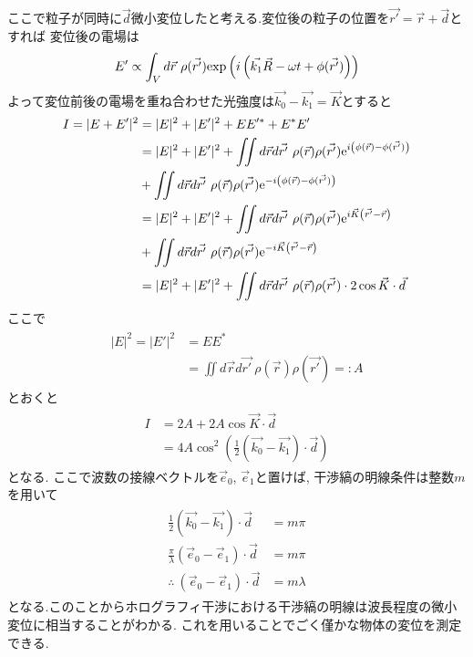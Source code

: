 ここで粒子が同時に$\vec{d}$微小変位したと考える.変位後の粒子の位置を$\vec{r'}=\vec{r}+\vec{d}$とすれば
変位後の電場は
\begin{align}
  E'\propto\int_Vd\vec{r}\ \rho(\vec{r'}){\rm exp}\left(i\left(\vec{k_1}\vec{R}-\omega t+\phi(\vec{r'})\right)\right)
\end{align}
よって変位前後の電場を重ね合わせた光強度は$\vec{k_0}-\vec{k_1}=\vec{K}$とすると
\begin{align}
  \begin{split}
    I=|E+E'|^2&=|E|^2+|E'|^2+EE'^*+E^*E'\\
    &=|E|^2+|E'|^2+\iint d\vec{r}d\vec{r'}\ \rho(\vec{r})\rho(\vec{r'}){\rm e}^{i\left(\phi(\vec{r})-\phi(\vec{r'})\right)}\\
    &+\iint d\vec{r}d\vec{r'}\ \rho(\vec{r})\rho(\vec{r'}){\rm e}^{-i\left(\phi(\vec{r})-\phi(\vec{r'})\right)}\\
    &=|E|^2+|E'|^2+\iint d\vec{r}d\vec{r'}\ \rho(\vec{r})\rho(\vec{r'}){\rm e}^{i\vec{K}\left(\vec{r'}-\vec{r}\right)}\\
    &+\iint d\vec{r}d\vec{r'}\ \rho(\vec{r})\rho(\vec{r'}){\rm e}^{-i\vec{K}\left(\vec{r'}-\vec{r}\right)}\\
    &=|E|^2+|E'|^2+\iint d\vec{r}d\vec{r'}\ \rho(\vec{r})\rho(\vec{r'})\cdot 2\cos\vec{K}\cdot\vec{d}
  \end{split}
\end{align}
ここで
\begin{align}
  \begin{split}
    |E|^2=|E'|^2&=EE^*\\
    &=\iint d\vec{r}d\vec{r'}\ \rho(\vec{r})\rho(\vec{r'})=:A
  \end{split}
\end{align}
とおくと
\begin{align}
  \begin{split}
    I&=2A+2A\cos\vec{K}\cdot\vec{d}\\
    &=4A\cos^2\left(\frac{1}{2}(\vec{k_0}-\vec{k_1})\cdot\vec{d}\right)
  \end{split}
\end{align}
となる.
ここで波数の接線ベクトルを$\vec{e}_0$, $\vec{e}_1$と置けば,
干渉縞の明線条件は整数$m$を用いて
\begin{align}
  \begin{split}
    \frac{1}{2}(\vec{k_0}-\vec{k_1})\cdot\vec{d}&=m\pi\\
    \frac{\pi}{\lambda}(\vec{e}_0-\vec{e}_1)\cdot\vec{d}&=m\pi\\
    \therefore\ (\vec{e}_0-\vec{e}_1)\cdot\vec{d}&=m\lambda
  \end{split}
\end{align}
となる.このことからホログラフィ干渉における干渉縞の明線は波長程度の微小変位に相当することがわかる.
これを用いることでごく僅かな物体の変位を測定できる.
